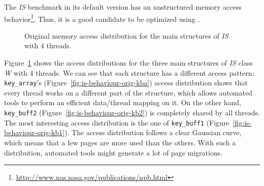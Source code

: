 The \emph{IS} benchmark in its default version has an unstructured memory access behavior\footnote{\url{http://www.nas.nasa.gov/publications/npb.html}}. Thus, it is a good candidate to be optimized using \TABARNAC.
\begin{figure}[!p]
    \centering

    \vspace{-1mm}
    \vspace{-1mm}
    \caption{Original memory access distribution for the main structures of
        \emph{IS} with $4$ threads.}
    \label{fig:is-behaviour-orig}
\end{figure}
Figure~\ref{fig:is-behaviour-orig} shows the access distributions for the
three main structures of \emph{IS} class \emph{W} with $4$ threads. We can see that
each structure has a different access pattern: \texttt{key\_array}'s
(Figure~\ref{fig:is-behaviour-orig-kba}) access distribution shows that every
thread works on a different part of the structure, which allows automated
tools to perform an efficient data/thread mapping on it. On the other hand, \texttt{key\_buff2}
(Figure~\ref{fig:is-behaviour-orig-kb2}) is completely shared by all threads.
The most interesting access distribution is the one of \texttt{key\_buff1}
(Figure~\ref{fig:is-behaviour-orig-kb1}). The access distribution follows a clear Gaussian curve, which means that a few pages are more used than the
others. With such a distribution, automated tools might generate a lot of page
migrations.



